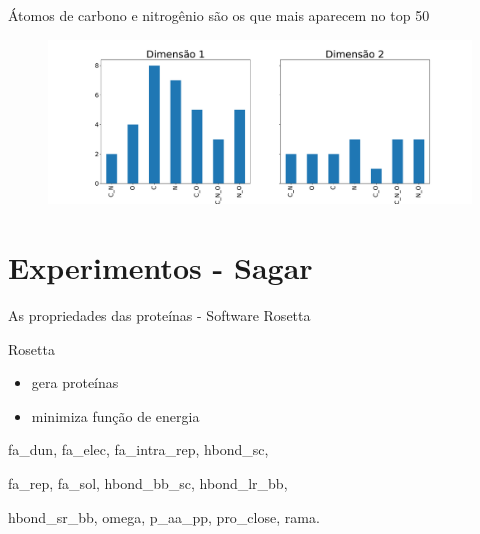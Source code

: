 \documentclass[10pt]{beamer}
\begin{document}
\begin{frame}{Átomos de carbono e nitrogênio são os que mais aparecem no top 50}
    \begin{figure}
        \centering
        \includegraphics[width=1.0\textwidth]{images/plt_dim.pdf}
    \end{figure}
\end{frame}

\section{Experimentos - Sagar}

\begin{frame}{As propriedades das proteínas - Software Rosetta}

\begin{block}{Rosetta}
    \begin{itemize}
        \item gera proteínas
        \item minimiza função de energia
    \end{itemize}
\end{block}

\begin{center}
    fa\_dun, fa\_elec, fa\_intra\_rep, hbond\_sc,

    fa\_rep, fa\_sol, hbond\_bb\_sc, hbond\_lr\_bb,

    hbond\_sr\_bb, omega, p\_aa\_pp, pro\_close, rama.
\end{center} 
\end{frame}
\end{document}
